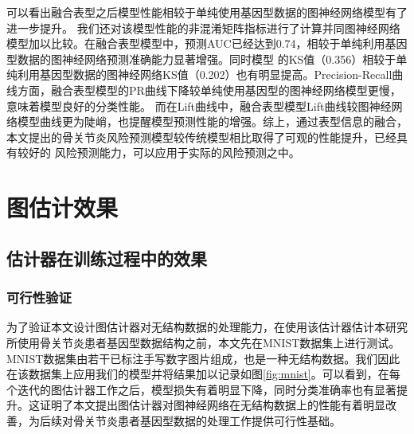 可以看出融合表型之后模型性能相较于单纯使用基因型数据的图神经网络模型有了进一步提升。
我们还对该模型性能的非混淆矩阵指标进行了计算并同图神经网络模型加以比较。在融合表型模型中，预测AUC已经达到0.74，相较于单纯利用基因型数据的图神经网络预测准确能力显著增强。同时模型
的KS值（0.356）相较于单纯利用基因型数据的图神经网络KS值（0.202）也有明显提高。Precision-Recall曲线方面，融合表型模型的PR曲线下降较单纯使用基因型的图神经网络模型更慢，意味着模型良好的分类性能。
而在Lift曲线中，融合表型模型Lift曲线较图神经网络模型曲线更为陡峭，也提醒模型预测性能的增强。综上，通过表型信息的融合，本文提出的骨关节炎风险预测模型较传统模型相比取得了可观的性能提升，已经具有较好的
风险预测能力，可以应用于实际的风险预测之中。


\section{图估计效果}

\subsection{估计器在训练过程中的效果}

\subsubsection{可行性验证}

为了验证本文设计图估计器对无结构数据的处理能力，在使用该估计器估计本研究所使用骨关节炎患者基因型数据结构之前，本文先在MNIST数据集上进行测试。MNIST数据集\cite{lecun_gradient-based_1998}由若干已标注手写数字图片组成，也是一种无结构数据。我们因此在该数据集上应用我们的模型并将结果加以记录如图\ref{fig:mnist}。可以看到，在每个迭代的图估计器工作之后，模型损失有着明显下降，同时分类准确率也有显著提升。这证明了本文提出图估计器对图神经网络在无结构数据上的性能有着明显改善，为后续对骨关节炎患者基因型数据的处理工作提供可行性基础。


